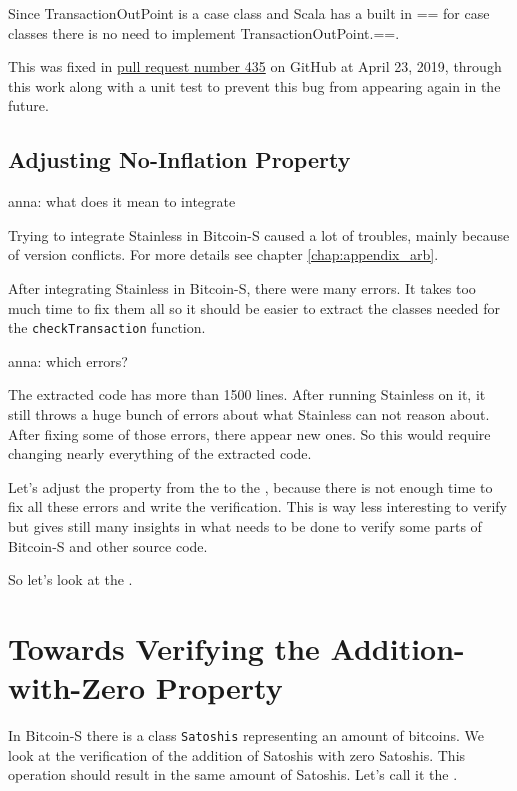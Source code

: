 \documentclass[runningheads]{llncs}
\newcommand{\todo}[1]{{\par \color{red}#1}}
\begin{document}
Since TransactionOutPoint is a case class and Scala has a built in ==
for case classes there is no need to implement TransactionOutPoint.==.

This was fixed in
\href{https://github.com/bitcoin-s/bitcoin-s/pull/435}{pull request
  number 435} on GitHub at April 23, 2019, through this work along
with a unit test to prevent this bug from appearing again in the
future.


\subsection{Adjusting No-Inflation Property}

\todo{anna: what does it mean to integrate}

Trying to integrate Stainless in Bitcoin-S caused a lot of troubles,
mainly because of version conflicts.  For more details see chapter
\ref{chap:appendix_arb}.

After integrating Stainless in Bitcoin-S, there were many errors.  It
takes too much time to fix them all so it should be easier to extract
the classes needed for the \texttt{checkTransaction} function.
\todo{anna: which errors?}

The extracted code has more than 1500 lines.  After running Stainless
on it, it still throws a huge bunch of errors about what Stainless can
not reason about.  After fixing some of those errors, there appear new
ones.  So this would require changing nearly everything of the
extracted code.

Let's adjust the property from the  to the
, because there is not enough time to fix all
these errors and write the verification.  This is way less interesting
to verify but gives still many insights in what needs to be done to
verify some parts of Bitcoin-S and other source code.

So let's look at the .



\section{Towards Verifying the Addition-with-Zero Property}

\label{chap:verify_add}

In Bitcoin-S there is a class \texttt{Satoshis} representing an amount of bitcoins.
We look at the verification of the addition of Satoshis with zero Satoshis.
This operation should result in the same amount of Satoshis.
Let's call it the .
\end{document}
